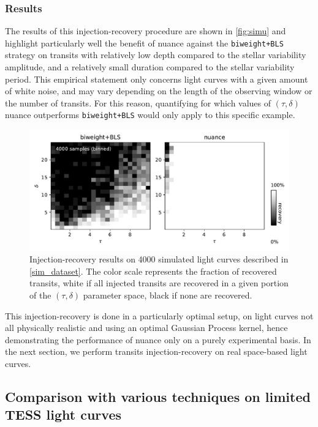\documentclass[modern]{aastex631}
\newcommand{\wtls}{\texttt{biweight+BLS}}
\begin{document}
\subsubsection*{Results}
The results of this injection-recovery procedure are shown in \autoref{fig:simu} and highlight particularly well the benefit of \textsf{nuance} against the \wtls{} strategy on transits with relatively low depth compared to the stellar variability amplitude, and a relatively small duration compared to the stellar variability period. This empirical statement only concerns light curves with a given amount of white noise, and may vary depending on the length of the observing window or the number of transits. For this reason, quantifying for which values of $(\tau, \delta)$ \textsf{nuance} outperforms \wtls{} would only apply to this specific example.
\begin{figure}[H]
    \begin{centering}
        \includegraphics[width=\linewidth]{../workflows/synthetic-injection-recovery/figures/synthetic_ir.pdf}
        \caption{Injection-recovery results on 4000 simulated light curves described in \autoref{sim_dataset}. The color scale represents the fraction of recovered transits, white if all injected transits are recovered in a given portion of the $(\tau, \delta)$ parameter space, black if none are recovered.}
        \label{fig:simu}
    \end{centering}
\end{figure}

\noindent This injection-recovery is done in a particularly optimal setup, on light curves not all physically realistic and using an optimal Gaussian Process kernel, hence demonstrating the performance of \textsf{nuance} only on a purely experimental basis. In the next section, we perform transits injection-recovery on real space-based light curves.

\newpage
\subsection{Comparison with various techniques on limited TESS light curves}\label{real}
\end{document}
